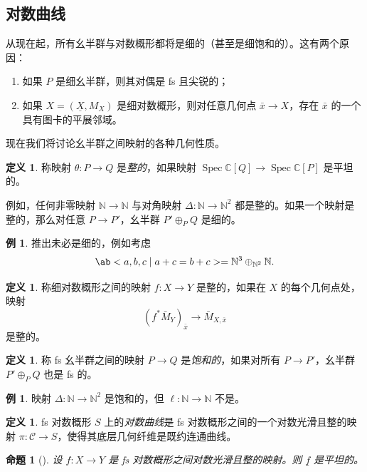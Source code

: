 \documentclass{amsart}
\newtheorem{prop}[thm]{命题}
\theoremstyle{definition}
\newtheorem{defn}[thm]{定义}
\newtheorem{exm}[thm]{例}
\theoremstyle{remark}
\theoremstyle{plain}
\theoremstyle{definition}
\theoremstyle{remark}
\newcommand{\N}{\mathbb{N}}
\newcommand{\C}{\mathbb{C}}
\newcommand{\mc}[1]{\mathcal{#1}}
\newcommand{\ul}[1]{\underline{#1}}
\newcommand{\1}{\mathbf{1}}
\newcommand{\2}{\mathbf{2}}
\newcommand{\3}{\mathbf{3}}
\DeclareMathOperator{\Spec}{Spec}
\begin{document}
\subsection{对数曲线}%
\label{sub:Log curves}

从现在起，所有幺半群与对数概形都将是细的（甚至是细饱和的）。这有两个原因：
\begin{enumerate}
    \item 如果 \(P\) 是细幺半群，则其对偶是 fs 且尖锐的；
    \item 如果 \(X = (\ul{X}, M_X)\) 是细对数概形，则对任意几何点 \(\bar{x} \to X\)，存在 \(\bar{x}\) 的一个具有图卡的平展邻域。
\end{enumerate}

现在我们将讨论幺半群之间映射的各种几何性质。
\begin{defn}
    称映射 \(\theta \colon P \to Q\) 是\textit{整的}，如果映射 \(\Spec\C[Q] \to \Spec \C[P]\) 是平坦的。
\end{defn}

例如，任何非零映射 \(\N \to \N\) 与对角映射 \(\Delta \colon\N \to \N^2\) 都是整的。如果一个映射是整的，那么对任意 \(P \to P'\)，幺半群 \(P' \oplus_P Q\) 是细的。

\begin{exm}
    推出未必是细的，例如考虑
    \[ \ab< a ,b,c \mid a+c=b+c> = \N^3 \oplus_{\N^2} \N. \]
\end{exm}

\begin{defn}
    称细对数概形之间的映射 \(f \colon X \to Y\) 是整的，如果在 \(X\) 的每个几何点处，映射
    \[ (f^*\bar{M}_Y)_{\bar{x}} \to \bar{M}_{X,\bar{x}} \]
    是整的。
\end{defn}

\begin{defn}
    称 fs 幺半群之间的映射 \(P \to Q\) 是\textit{饱和的}，如果对所有 \(P \to P'\)，幺半群 \(P' \oplus_P Q\) 也是 fs 的。
\end{defn}

\begin{exm}
    映射 \(\Delta \colon \N \to \N^2\) 是饱和的，但 \(\ell \colon \N \to \N\) 不是。
\end{exm}

\begin{defn}
    fs 对数概形 \(S\) 上的\textit{对数曲线}是 fs 对数概形之间的一个对数光滑且整的映射 \(\pi \colon \mc{C} \to S\)，使得其底层几何纤维是既约连通曲线。
\end{defn}

\begin{prop}[{\cite{Kato1989}}]
    设 \(f \colon X \to Y\) 是 fs 对数概形之间对数光滑且整的映射。则 \(\ul{f}\) 是平坦的。
\end{prop}
\end{document}
